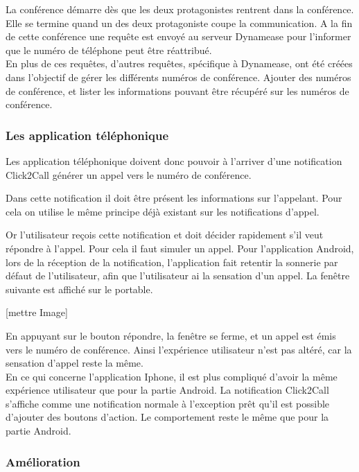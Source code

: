 La conférence démarre dès que les deux protagonistes rentrent dans la conférence. Elle se termine quand un des deux protagoniste coupe la communication. A la fin de cette conférence une requête est envoyé au serveur Dynamease pour l'informer que le numéro de téléphone peut être réattribué.\\

En plus de ces requêtes, d'autres requêtes, spécifique à Dynamease, ont été créées dans l'objectif de gérer les différents numéros de conférence. Ajouter des numéros de conférence, et lister les informations pouvant être récupéré  sur les numéros de conférence.

\subsubsection{Les application téléphonique} 

Les application téléphonique doivent donc pouvoir à l'arriver d'une notification Click2Call générer un appel vers le numéro de conférence.

Dans cette notification il doit être présent les informations sur l'appelant. Pour cela on utilise le même principe déjà existant sur les notifications d'appel.

Or l'utilisateur reçois cette notification et doit décider rapidement s'il veut répondre à l'appel. Pour cela il faut simuler un appel. Pour l'application Android, lors de la réception de la notification, l'application fait retentir la sonnerie par défaut de l'utilisateur, afin que l'utilisateur ai la sensation d'un appel. La fenêtre suivante est affiché sur le portable.

[mettre Image]

En appuyant sur le bouton répondre, la fenêtre se ferme, et un appel est émis vers le numéro de conférence. Ainsi l'expérience utilisateur n'est pas altéré, car la sensation d'appel reste la même.\\

En ce qui concerne l'application Iphone, il est plus compliqué d'avoir la même expérience utilisateur que pour la partie Android. La notification Click2Call s'affiche comme une notification normale à l'exception prêt qu'il est possible d'ajouter des boutons d'action.
Le comportement reste le même que pour la partie Android.

\subsubsection{Amélioration}

